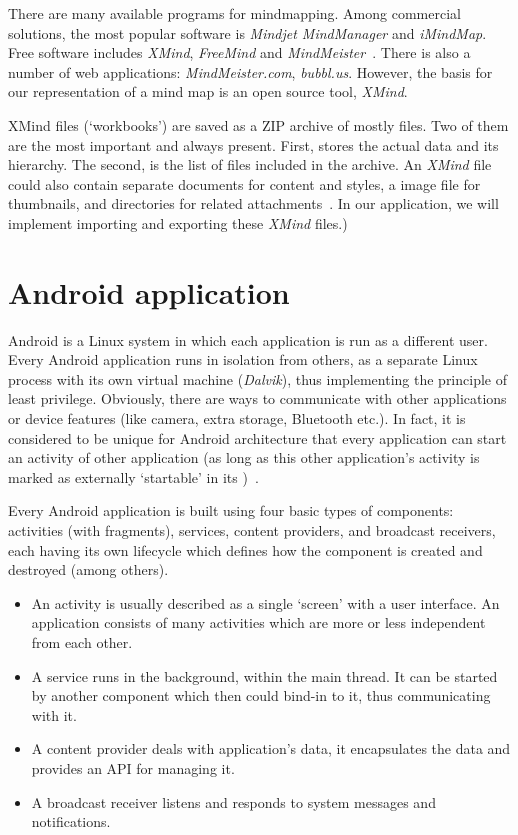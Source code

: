 There are many available programs for mindmapping. Among commercial solutions, the most popular software is {\em Mindjet MindManager} and {\em iMindMap}. Free software includes {\em XMind}, {\em FreeMind} and \emph{MindMeister}~\cite{Wiki:Software}. There is also a number of web applications: \emph{MindMeister.com}, \emph{bubbl.us}. However, the basis for our representation of a mind map is an open source tool, {\em XMind}.

XMind files (`workbooks') are saved as a ZIP archive of mostly  files. Two of them are the most important and always present. First,  stores the actual data and its hierarchy. The second,  is the list of files included in the archive. An {\em XMind} file could also contain separate  documents for content and styles, a  image file for thumbnails, and directories for related attachments~\cite{XMind:2009:Format}. In our application, we will implement importing and exporting these {\em XMind} files.)

\section{Android application}
\label{sec:android-theory}

Android is a Linux system in which each application is run as a different user. Every Android application runs in isolation from others, as a separate Linux process with its own virtual machine ({\em Dalvik}), thus implementing the principle of least privilege. Obviously, there are ways to communicate with other applications or device features (like camera, extra storage, Bluetooth etc.). In fact, it is considered to be unique for Android architecture that every application can start an activity of other application (as long as this other application's activity is marked as externally `startable' in its )~\cite{Collins:Android}.

Every Android application is built using four basic types of components: activities (with fragments), services, content providers, and broadcast receivers, each having its own lifecycle which defines how the component is created and destroyed (among others).

\begin{itemize}
	\item An activity is usually described as a single `screen' with a user interface. An application consists of many activities which are more or less independent from each other.
	\item A service runs in the background, within the main thread. It can be started by another component which then could bind-in to it, thus communicating with it.
	\item A content provider deals with application's data, it encapsulates the data and provides an API for managing it.
	\item A broadcast receiver listens and responds to system messages and notifications.
\end{itemize}

